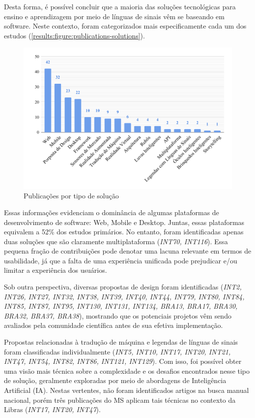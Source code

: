 Desta forma, é possível concluir que a maioria das soluções tecnológicas para ensino e aprendizagem por meio de línguas de sinais vêm se baseando em software. Neste contexto, foram categorizados mais especificamente cada um dos estudos (\autoref{results:figure:publications-solutions}).

\begin{figure}[htbp]
\caption{Publicações por tipo de solução}
\label{results:figure:publications-solutions}
\centerline{\includegraphics[width=\columnwidth]{images/publications-solutions.pdf}}
\fautor
\end{figure}

Essas informações evidenciam o dominância de algumas plataformas de desenvolvimento de software: Web, Mobile e Desktop. Juntas, essas plataformas equivalem a 52\% dos estudos primários. No entanto, foram identificadas apenas duas soluções que são claramente multiplataforma (\textit{INT70, INT116}). Essa pequena fração de contribuições pode denotar uma lacuna relevante em termos de usabilidade, já que a falta de uma experiência unificada pode prejudicar e/ou limitar a experiência dos usuários.

Sob outra perspectiva, diversas propostas de design foram identificadas (\textit{INT2, INT26, INT27, INT32, INT38, INT39, INT40, INT44, INT79, INT80, INT84, INT85, INT87, INT95, INT130, INT131, INT134, BRA13, BRA17, BRA30, BRA32, BRA37, BRA38}), mostrando que os potenciais projetos vêm sendo avaliados pela comunidade científica antes de sua efetiva implementação.

Propostas relacionadas à tradução de máquina e legendas de línguas de sinais foram classificadas individualmente (\textit{INT5, INT10, INT17, INT20, INT21, INT47, INT54, INT82, INT86, INT121, INT129}). Com isso, foi possível obter uma visão mais técnica sobre a complexidade e os desafios encontrados nesse tipo de solução, geralmente exploradas por meio de abordagens de Inteligência Artificial (IA). Nestas vertentes, não foram identificados artigos na busca manual nacional, porém três publicações do MS aplicam tais técnicas no contexto da Libras (\textit{INT17, INT20, INT47}). 

